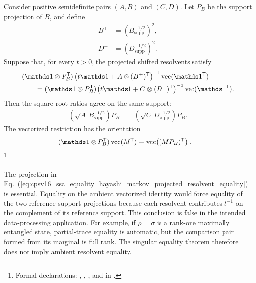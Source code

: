 \documentclass[11pt]{article}
\begin{document}
Consider positive semidefinite pairs $(A,B)$ and $(C,D)$. Let $P_B$ be the
support projection of $B$, and define
\begin{align}
    B^+
        &=\left(B^{-1/2}_{\mathrm{supp}}\right)^2,
    \label{eq:cpsv16_ssa_equality_hayashi_markov_b_generalized_inverse}\\
    D^+
        &=\left(D^{-1/2}_{\mathrm{supp}}\right)^2.
    \label{eq:cpsv16_ssa_equality_hayashi_markov_d_generalized_inverse}
\end{align}
Suppose that, for every $t>0$, the projected shifted resolvents satisfy
\begin{align}
    &(\Id\otimes P_B^{\mathsf T})
    \left(t\Id+A\otimes(B^+)^{\mathsf T}\right)^{-1}
    \operatorname{vec}(\Id^{\mathsf T})
        \notag\\
    &\qquad=
    (\Id\otimes P_B^{\mathsf T})
    \left(t\Id+C\otimes(D^+)^{\mathsf T}\right)^{-1}
    \operatorname{vec}(\Id^{\mathsf T}).
    \label{eq:cpsv16_ssa_equality_hayashi_markov_projected_resolvent_equality}
\end{align}
Then the square-root ratios agree on the same support:
\begin{align}
    \left(\sqrt A\,B^{-1/2}_{\mathrm{supp}}\right)P_B
        &=
        \left(\sqrt C\,D^{-1/2}_{\mathrm{supp}}\right)P_B.
    \label{eq:cpsv16_ssa_equality_hayashi_markov_support_sqrt_ratio}
\end{align}
The vectorized restriction has the orientation
\begin{align}
    (\Id\otimes P_B^{\mathsf T})
    \operatorname{vec}(M^{\mathsf T})
        &=
        \operatorname{vec}\!\left((MP_B)^{\mathsf T}\right).
    \label{eq:cpsv16_ssa_equality_hayashi_markov_vectorized_support_orientation}
\end{align}
\footnote{Formal declarations:
,
,
, and
 in
.}

The projection in
Eq.~(\ref{eq:cpsv16_ssa_equality_hayashi_markov_projected_resolvent_equality})
is essential. Equality on the ambient vectorized identity would force equality
of the two reference support projections because each resolvent contributes
$t^{-1}$ on the complement of its reference support. This conclusion is false
in the intended data-processing application. For example, if $\rho=\sigma$ is
a rank-one maximally entangled state, partial-trace equality is automatic, but
the comparison pair formed from its marginal is full rank. The singular
equality theorem therefore does not imply ambient resolvent equality.
\end{document}

